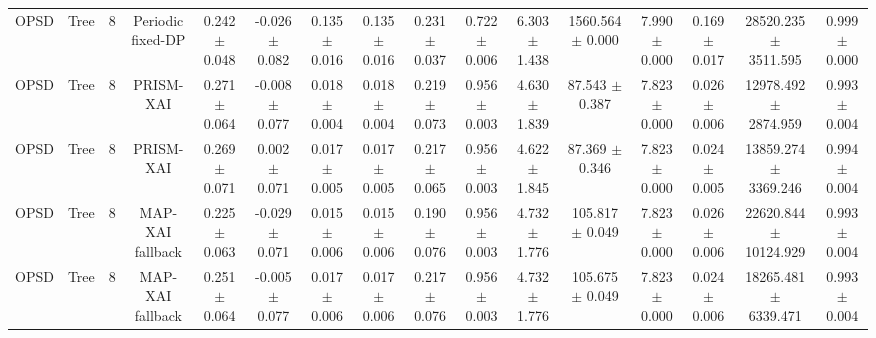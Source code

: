 \begin{tabular}{lccccccccccccccc}
OPSD & Tree & 8 & Periodic fixed-DP & 0.242 $\pm$ 0.048 & -0.026 $\pm$ 0.082 & 0.135 $\pm$ 0.016 & 0.135 $\pm$ 0.016 & 0.231 $\pm$ 0.037 & 0.722 $\pm$ 0.006 & 6.303 $\pm$ 1.438 & 1560.564 $\pm$ 0.000 & 7.990 $\pm$ 0.000 & 0.169 $\pm$ 0.017 & 28520.235 $\pm$ 3511.595 & 0.999 $\pm$ 0.000 \\
OPSD & Tree & 8 & PRISM-XAI & 0.271 $\pm$ 0.064 & -0.008 $\pm$ 0.077 & 0.018 $\pm$ 0.004 & 0.018 $\pm$ 0.004 & 0.219 $\pm$ 0.073 & 0.956 $\pm$ 0.003 & 4.630 $\pm$ 1.839 & 87.543 $\pm$ 0.387 & 7.823 $\pm$ 0.000 & 0.026 $\pm$ 0.006 & 12978.492 $\pm$ 2874.959 & 0.993 $\pm$ 0.004 \\
OPSD & Tree & 8 & PRISM-XAI & 0.269 $\pm$ 0.071 & 0.002 $\pm$ 0.071 & 0.017 $\pm$ 0.005 & 0.017 $\pm$ 0.005 & 0.217 $\pm$ 0.065 & 0.956 $\pm$ 0.003 & 4.622 $\pm$ 1.845 & 87.369 $\pm$ 0.346 & 7.823 $\pm$ 0.000 & 0.024 $\pm$ 0.005 & 13859.274 $\pm$ 3369.246 & 0.994 $\pm$ 0.004 \\
OPSD & Tree & 8 & MAP-XAI fallback & 0.225 $\pm$ 0.063 & -0.029 $\pm$ 0.071 & 0.015 $\pm$ 0.006 & 0.015 $\pm$ 0.006 & 0.190 $\pm$ 0.076 & 0.956 $\pm$ 0.003 & 4.732 $\pm$ 1.776 & 105.817 $\pm$ 0.049 & 7.823 $\pm$ 0.000 & 0.026 $\pm$ 0.006 & 22620.844 $\pm$ 10124.929 & 0.993 $\pm$ 0.004 \\
OPSD & Tree & 8 & MAP-XAI fallback & 0.251 $\pm$ 0.064 & -0.005 $\pm$ 0.077 & 0.017 $\pm$ 0.006 & 0.017 $\pm$ 0.006 & 0.217 $\pm$ 0.076 & 0.956 $\pm$ 0.003 & 4.732 $\pm$ 1.776 & 105.675 $\pm$ 0.049 & 7.823 $\pm$ 0.000 & 0.024 $\pm$ 0.006 & 18265.481 $\pm$ 6339.471 & 0.993 $\pm$ 0.004 \\
\bottomrule
\end{tabular}
